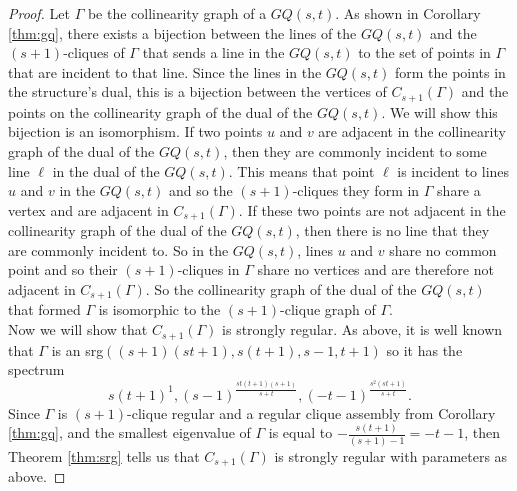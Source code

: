 \documentclass[12pt]{report}
\theoremstyle{definition}
\begin{document}
\begin{proof}
    Let $\Gamma$ be the collinearity graph of a $GQ(s,t)$. As shown in Corollary \ref{thm:gq}, there exists a bijection between the lines of the $GQ(s,t)$ and the $(s+1)$-cliques of $\Gamma$ that sends a line in the $GQ(s,t)$ to the set of points in $\Gamma$ that are incident to that line. Since the lines in the $GQ(s,t)$ form the points in the structure's dual, this is a bijection between the vertices of $C_{s+1}(\Gamma)$ and the points on the collinearity graph of the dual of the $GQ(s,t)$. We will show this bijection is an isomorphism. If two points $u$ and $v$ are adjacent in the collinearity graph of the dual of the $GQ(s,t)$, then they are commonly incident to some line $\ell$ in the dual of the $GQ(s,t)$. This means that point $\ell$ is incident to lines $u$ and $v$ in the $GQ(s,t)$ and so the $(s+1)$-cliques they form in $\Gamma$ share a vertex and are adjacent in $C_{s+1}(\Gamma)$. If these two points are not adjacent in the collinearity graph of the dual of the $GQ(s,t)$, then there is no line that they are commonly incident to. So in the $GQ(s,t)$, lines $u$ and $v$ share no common point and so their $(s+1)$-cliques in $\Gamma$ share no vertices and are therefore not adjacent in $C_{s+1}(\Gamma)$. So the collinearity graph of the dual of the $GQ(s,t)$ that formed $\Gamma$ is isomorphic to the $(s+1)$-clique graph of $\Gamma$.\\
    Now we will show that $C_{s+1}(\Gamma)$ is strongly regular. As above, it is well known that $\Gamma$ is an srg$((s+1)(st+1),s(t+1),s-1, t+1)$ so it has the spectrum \[s(t+1)^1,(s-1)^{\frac{st(t+1)(s+1)}{s+t}},(-t-1)^{\frac{s^2(st+1)}{s+t}}.\]
    Since $\Gamma$ is $(s+1)$-clique regular and a regular clique assembly from Corollary \ref{thm:gq}, and the smallest eigenvalue of $\Gamma$ is equal to $-\frac{s(t+1)}{(s+1)-1}=-t-1$, then Theorem \ref{thm:srg} tells us that $C_{s+1}(\Gamma)$ is strongly regular with parameters as above.
\end{proof}
\end{document}
